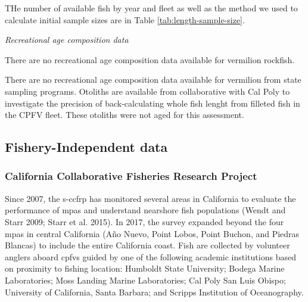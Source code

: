 \documentclass[11pt,
  english,
  a4paper,
]{article}
\begin{document}
THe number of available fish by year and fleet as well as the method we used to calculate initial sample sizes are in Table \ref{tab:length-sample-size}.

\emph{Recreational age composition data}

There are no recreational age composition data available for vermilion rockfish.

There are no recreational age composition data available for vermilion from state sampling programs. Otoliths are available from collaborative with Cal Poly to investigate the precision of back-calculating whole fish lenght from filleted fish in the CPFV fleet. These otoliths were not aged for this assessment.


\hypertarget{fishery-independent-data}{%
\subsection{Fishery-Independent data}\label{fishery-independent-data}}

\leavevmode\tagmcend\tagstructend


\hypertarget{california-collaborative-fisheries-research-project}{%
\subsubsection{California Collaborative Fisheries Research Project}\label{california-collaborative-fisheries-research-project}}

\leavevmode\tagmcend\tagstructend

Since 2007, the \Gls{s-ccfrp} has monitored several areas in California to evaluate the performance of \Gls{mpa}s and understand nearshore fish populations {(Wendt and Starr 2009; Starr et al. 2015)\leavevmode\tagmcend\tagstructend}. In 2017, the survey expanded beyond the four \Gls{mpa}s in central California (Año Nuevo, Point Lobos, Point Buchon, and Piedras Blancas) to include the entire California coast. Fish are collected by volunteer anglers aboard \Gls{cpfv}s guided by one of the following academic institutions based on proximity to fishing location: Humboldt State University; Bodega Marine Laboratories; Moss Landing Marine Laboratories; Cal Poly San Luis Obispo; University of California, Santa Barbara; and Scripps Institution of Oceanography.
\end{document}
